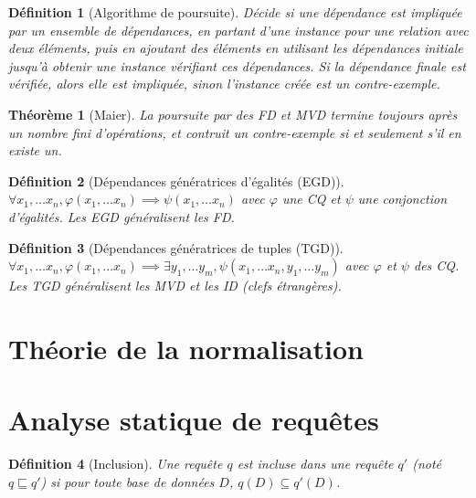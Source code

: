 \documentclass[landscape]{article}
\newcommand{\1}{\mathbbm{1}}
\renewcommand{\phi}{\varphi}
\newtheorem{theo}{Théorème}
\newtheorem{defi}{Définition}
\begin{document}
\begin{multicols}{2}
    \begin{defi}[Algorithme de poursuite]
        Décide si une dépendance est impliquée par un ensemble de dépendances, en
        partant d'une instance pour une relation avec deux éléments, puis en ajoutant
        des éléments en utilisant les dépendances initiale jusqu'à obtenir une instance
        vérifiant ces dépendances. Si la dépendance finale est vérifiée, alors
        elle est impliquée, sinon l'instance créée est un contre-exemple.
    \end{defi}

    \begin{theo}[Maier]
        La poursuite par des FD et MVD termine toujours après un nombre fini
        d'opérations, et contruit un contre-exemple si et seulement s'il en
        existe un.
    \end{theo}

    \begin{defi}[Dépendances génératrices d'égalités (EGD)]
        $\forall x_1,\ldots x_n, \phi(x_1,\ldots x_n)\implies \psi(x_1,\ldots x_n)$
        avec $\phi$ une CQ et $\psi$ une conjonction d'égalités. Les EGD généralisent
        les FD.
    \end{defi}

    \begin{defi}[Dépendances génératrices de tuples (TGD)]
        $\forall x_1,\ldots x_n, \phi(x_1,\ldots x_n)\implies\exists y_1,\ldots y_m, \psi(x_1,\ldots x_n, y_1, \ldots y_m)$
        avec $\phi$ et $\psi$ des CQ. Les TGD généralisent les MVD et les ID
        (clefs étrangères).
    \end{defi}


    \section{Théorie de la normalisation}
    

    \section{Analyse statique de requêtes}

    \begin{defi}[Inclusion]
        Une requête $q$ est incluse dans une requête $q'$ (noté $q\sqsubseteq q'$)
        si pour toute base de données $D$, $q(D)\subseteq q'(D)$.
    \end{defi}


\end{multicols}
\end{document}
